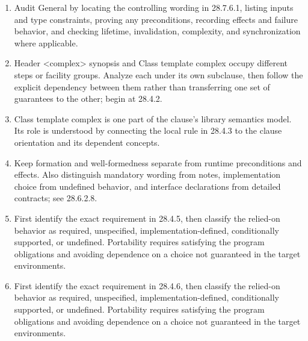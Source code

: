 \documentclass[11pt,letterpaper]{article}
\begin{document}
\begin{enumerate}
\item Audit General by locating the controlling wording in 28.7.6.1, listing inputs and type constraints, proving any preconditions, recording effects and failure behavior, and checking lifetime, invalidation, complexity, and synchronization where applicable.
\item Header <complex> synopsis and Class template complex occupy different steps or facility groups. Analyze each under its own subclause, then follow the explicit dependency between them rather than transferring one set of guarantees to the other; begin at 28.4.2.
\item Class template complex is one part of the clause's library semantics model. Its role is understood by connecting the local rule in 28.4.3 to the clause orientation and its dependent concepts.
\item Keep formation and well-formedness separate from runtime preconditions and effects. Also distinguish mandatory wording from notes, implementation choice from undefined behavior, and interface declarations from detailed contracts; see 28.6.2.8.
\item First identify the exact requirement in 28.4.5, then classify the relied-on behavior as required, unspecified, implementation-defined, conditionally supported, or undefined. Portability requires satisfying the program obligations and avoiding dependence on a choice not guaranteed in the target environments.
\item First identify the exact requirement in 28.4.6, then classify the relied-on behavior as required, unspecified, implementation-defined, conditionally supported, or undefined. Portability requires satisfying the program obligations and avoiding dependence on a choice not guaranteed in the target environments.
\end{enumerate}
\end{document}
